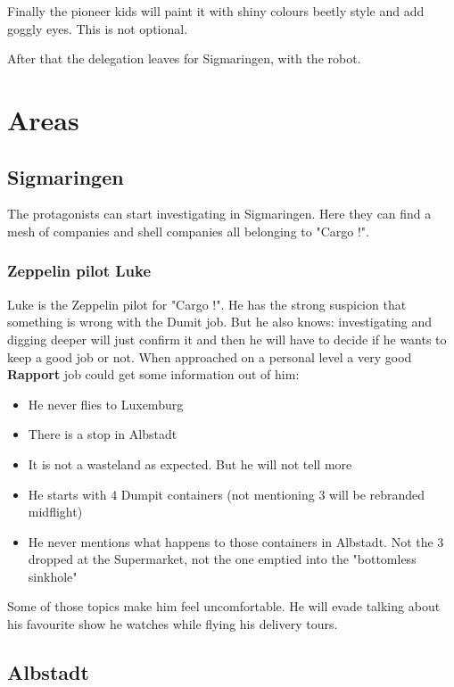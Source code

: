Finally the pioneer kids will paint it with shiny colours beetly style and add goggly eyes. This is not optional.

After that the delegation leaves for Sigmaringen, with the robot.

\section{Areas}

\subsection{Sigmaringen}

The protagonists can start investigating in Sigmaringen. Here they can find a mesh of companies and shell companies all belonging to "Cargo !".

\subsubsection{Zeppelin pilot Luke}

Luke is the Zeppelin pilot for "Cargo !". He has the strong suspicion that something is wrong with the Dumit job. But he also knows: investigating and digging deeper will just confirm it and then he will have to decide if he wants to keep a good job or not. When approached on a personal level a very good \textbf{Rapport} job could get some information out of him:

\begin{itemize}
    \item He never flies to Luxemburg
    \item There is a stop in Albstadt
    \item It is not a wasteland as expected. But he will not tell more
    \item He starts with 4 Dumpit containers (not mentioning 3 will be rebranded midflight)
    \item He never mentions what happens to those containers in Albstadt. Not the 3 dropped at the Supermarket, not the one emptied into the "bottomless sinkhole"
\end{itemize}

Some of those topics make him feel uncomfortable. He will evade talking about his favourite show he watches while flying his delivery tours.

\subsection{Albstadt}

